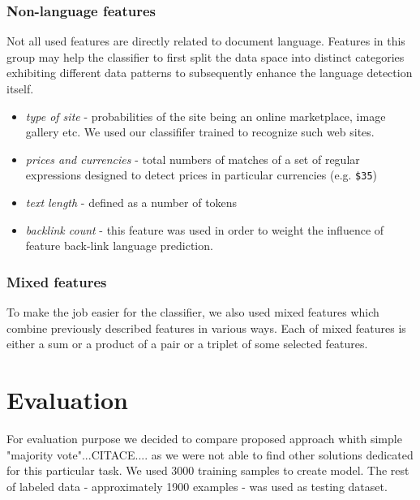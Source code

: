 \documentclass{acm_proc_article-sp}
\begin{document}
{ \subsubsection{Non-language features}
    Not all used features are directly related to document language. Features in this group may help the
    classifier to first split the data space into distinct categories exhibiting different data patterns 
    to subsequently enhance the language detection itself.

    \begin{itemize}
      \item \textit{type of site} - probabilities of the site being an online marketplace, image gallery etc. We used
      our classififer trained to recognize such web sites.
      \item \textit{prices and currencies} - total numbers of matches of a set of regular
      expressions designed to detect prices in particular currencies (e.g. \texttt{\$35}) 
      \item \textit{text length} - defined as a number of tokens
      \item \textit{backlink count} - this feature was used in order to weight the influence of feature
      back-link language prediction.
    \end{itemize}

  \subsubsection{Mixed features}
    To make the job easier for the classifier, we also used mixed features which combine previously
    described features in various ways. Each of mixed features is either a sum or a product of a
    pair or a triplet of some selected features. 

    \section{Evaluation}
 For evaluation purpose we decided to compare proposed approach whith simple "majority vote"...CITACE.... as we were 
 not able to find other solutions dedicated for this particular task. We used 3000 training samples to create model. 
 The rest of labeled data - approximately 1900 examples - was used as testing dataset.
 
}
\end{document}
